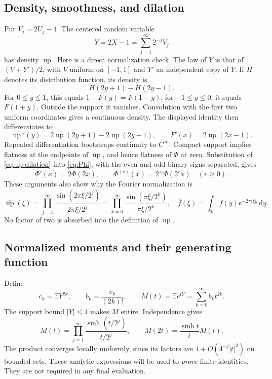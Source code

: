 \documentclass[11pt,a4paper]{article}
\theoremstyle{definition}
\theoremstyle{remark}
\newcommand{\Up}{\operatorname{up}}
\newcommand{\E}{\mathbb E}
\newcommand{\R}{\mathbb R}
\newcommand{\dd}{\,\mathrm d}
\begin{document}
\subsection{Density, smoothness, and dilation}
Put \(V_j=2U_j-1\).  The centered random variable
\begin{equation}
 Y=2X-1=\sum_{j=1}^{\infty}2^{-j}V_j                     \label{eq:Y}
\end{equation}
has density \(\Up\).  Here is a direct normalization check.  The law of
\(Y\) is that of \((V+Y')/2\), with \(V\) uniform on \([-1,1]\) and \(Y'\) an
independent copy of \(Y\).  If \(H\) denotes its distribution function, its density
is
\[
 H(2y+1)-H(2y-1).
\]
For \(0\leq y\leq1\), this equals \(1-F(y)=F(1-y)\); for
\(-1\leq y\leq0\), it equals \(F(1+y)\).  Outside the support it vanishes.
Convolution with the first two uniform coordinates gives a continuous density.
The displayed identity then differentiates to
\begin{equation}
 \Up'(y)=2\Up(2y+1)-2\Up(2y-1),\qquad
 F'(x)=2\Up(2x-1).                                      \label{eq:up-dilation}
\end{equation}
Repeated differentiation bootstraps continuity to \(C^\infty\).  Compact support
implies flatness at the endpoints of \(\Up\), and hence flatness of \(\Phi\) at zero.
Substitution of \eqref{eq:up-dilation} into \eqref{eq:Phi}, with the even and odd
binary signs separated, gives
\begin{equation}
 \Phi'(x)=2\Phi(2x),\qquad
 \Phi^{(r)}(x)=2^{\tau_r}\Phi(2^r x)\quad(r\geq0).        \label{eq:global-derivatives}
\end{equation}
These arguments also show why the Fourier normalization is
\begin{equation}
 \widehat{\Up}(\xi)=
 \prod_{j=1}^{\infty}\frac{\sin(2\pi\xi/2^j)}{2\pi\xi/2^j}
 =\prod_{k=0}^{\infty}\frac{\sin(\pi\xi/2^k)}{\pi\xi/2^k},
 \quad
 \widehat f(\xi)=\int_{\R}f(y)e^{-2\pi i\xi y}\dd y.       \label{eq:fourier-normalization}
\end{equation}
No factor of two is absorbed into the definition of \(\Up\).

\subsection{Normalized moments and their generating function}
Define
\begin{equation}
 c_k=\E Y^{2k},\qquad b_k=\frac{c_k}{(2k)!},\qquad
 M(t)=\E e^{tY}=\sum_{k=0}^{\infty}b_k t^{2k}.            \label{eq:moments}
\end{equation}
The support bound \(|Y|\leq1\) makes \(M\) entire.  Independence gives
\begin{equation}
 M(t)=\prod_{j=1}^{\infty}
       \frac{\sinh(t/2^j)}{t/2^j},\qquad
 M(2t)=\frac{\sinh t}{t}M(t).                            \label{eq:M-product}
\end{equation}
The product converges locally uniformly, since its factors are
\(1+O(4^{-j}|t|^2)\) on bounded sets.  These analytic expressions will be used to
\emph{prove} finite identities.  They are not required in any final evaluation.
\end{document}
